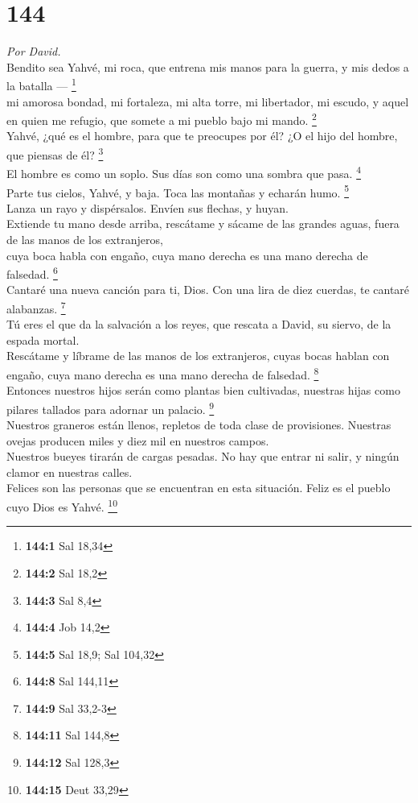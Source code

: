 \hypertarget{section-141}{%
\section{144}\label{section-141}}

\emph{Por David.}\\
 Bendito sea Yahvé, mi roca, que entrena mis manos para la
guerra, y mis dedos a la batalla --- \footnote{\textbf{144:1} Sal 18,34}\\
 mi amorosa bondad, mi fortaleza, mi alta torre, mi
libertador, mi escudo, y aquel en quien me refugio, que somete a mi
pueblo bajo mi mando. \footnote{\textbf{144:2} Sal 18,2}\\
 Yahvé, ¿qué es el hombre, para que te preocupes por él?
¿O el hijo del hombre, que piensas de él? \footnote{\textbf{144:3} Sal
  8,4}\\
 El hombre es como un soplo. Sus días son como una sombra
que pasa. \footnote{\textbf{144:4} Job 14,2}\\
 Parte tus cielos, Yahvé, y baja. Toca las montañas y
echarán humo. \footnote{\textbf{144:5} Sal 18,9; Sal 104,32}\\
 Lanza un rayo y dispérsalos. Envíen sus flechas, y
huyan.\\
 Extiende tu mano desde arriba, rescátame y sácame de las
grandes aguas, fuera de las manos de los extranjeros,\\
 cuya boca habla con engaño, cuya mano derecha es una mano
derecha de falsedad. \footnote{\textbf{144:8} Sal 144,11}\\
 Cantaré una nueva canción para ti, Dios. Con una lira de
diez cuerdas, te cantaré alabanzas. \footnote{\textbf{144:9} Sal 33,2-3}\\
 Tú eres el que da la salvación a los reyes, que rescata
a David, su siervo, de la espada mortal.\\
 Rescátame y líbrame de las manos de los extranjeros,
cuyas bocas hablan con engaño, cuya mano derecha es una mano derecha de
falsedad. \footnote{\textbf{144:11} Sal 144,8}\\
 Entonces nuestros hijos serán como plantas bien
cultivadas, nuestras hijas como pilares tallados para adornar un
palacio. \footnote{\textbf{144:12} Sal 128,3}\\
 Nuestros graneros están llenos, repletos de toda clase
de provisiones. Nuestras ovejas producen miles y diez mil en nuestros
campos.\\
 Nuestros bueyes tirarán de cargas pesadas. No hay que
entrar ni salir, y ningún clamor en nuestras calles.\\
 Felices son las personas que se encuentran en esta
situación. Feliz es el pueblo cuyo Dios es Yahvé. \footnote{\textbf{144:15}
  Deut 33,29}

